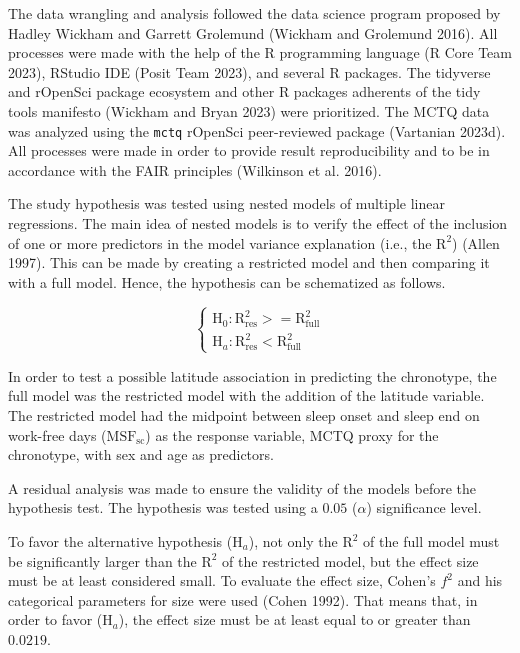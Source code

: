 \documentclass[
  12pt,
  a4paper,
  oneside]{tesesusp}
\begin{document}
The data wrangling and analysis followed the data science program
proposed by Hadley Wickham and Garrett Grolemund (Wickham and Grolemund
2016). All processes were made with the help of the R programming
language (R Core Team 2023), RStudio IDE (Posit Team 2023), and several
R packages. The tidyverse and rOpenSci package ecosystem and other R
packages adherents of the tidy tools manifesto (Wickham and Bryan 2023)
were prioritized. The MCTQ data was analyzed using the \texttt{mctq}
rOpenSci peer-reviewed package (Vartanian 2023d). All processes were
made in order to provide result reproducibility and to be in accordance
with the FAIR principles (Wilkinson et al. 2016).

The study hypothesis was tested using nested models of multiple linear
regressions. The main idea of nested models is to verify the effect of
the inclusion of one or more predictors in the model variance
explanation (i.e., the \(\text{R}^{2}\)) (Allen 1997). This can be made
by creating a restricted model and then comparing it with a full model.
Hence, the hypothesis can be schematized as follows.

\[
\begin{cases}
\text{H}_{0}: \text{R}^{2}_{\text{res}} >= \text{R}^{2}_{\text{full}} \\
\text{H}_{a}: \text{R}^{2}_{\text{res}} < \text{R}^{2}_{\text{full}}
\end{cases}
\]

\vspace{15pt}

In order to test a possible latitude association in predicting the
chronotype, the full model was the restricted model with the addition of
the latitude variable. The restricted model had the midpoint between
sleep onset and sleep end on work-free days (\(\text{MSF}_{\text{sc}}\))
as the response variable, MCTQ proxy for the chronotype, with sex and
age as predictors.

A residual analysis was made to ensure the validity of the models before
the hypothesis test. The hypothesis was tested using a \(0.05\)
(\(\alpha\)) significance level.

To favor the alternative hypothesis (\(\text{H}_{a}\)), not only the
\(\text{R}^{2}\) of the full model must be significantly larger than the
\(\text{R}^{2}\) of the restricted model, but the effect size must be at
least considered small. To evaluate the effect size, Cohen's \(f^{2}\)
and his categorical parameters for size were used (Cohen 1992). That
means that, in order to favor (\(\text{H}_{a}\)), the effect size must
be at least equal to or greater than \(0.0219\).
\end{document}
